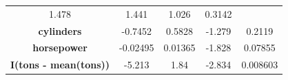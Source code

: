 \documentclass[]{article}
\begin{document}
\begin{longtable}[c]{@{}ccccc@{}}
\begin{minipage}[t]{0.13\columnwidth}
1.478
\strut\end{minipage} &
\begin{minipage}[t]{0.16\columnwidth}\centering\strut
1.441
\strut\end{minipage} &
\begin{minipage}[t]{0.12\columnwidth}\centering\strut
1.026
\strut\end{minipage} &
\begin{minipage}[t]{0.12\columnwidth}\centering\strut
0.3142
\strut\end{minipage}\tabularnewline
\begin{minipage}[t]{0.32\columnwidth}\centering\strut
\textbf{cylinders}
\strut\end{minipage} &
\begin{minipage}[t]{0.13\columnwidth}\centering\strut
-0.7452
\strut\end{minipage} &
\begin{minipage}[t]{0.16\columnwidth}\centering\strut
0.5828
\strut\end{minipage} &
\begin{minipage}[t]{0.12\columnwidth}\centering\strut
-1.279
\strut\end{minipage} &
\begin{minipage}[t]{0.12\columnwidth}\centering\strut
0.2119
\strut\end{minipage}\tabularnewline
\begin{minipage}[t]{0.32\columnwidth}\centering\strut
\textbf{horsepower}
\strut\end{minipage} &
\begin{minipage}[t]{0.13\columnwidth}\centering\strut
-0.02495
\strut\end{minipage} &
\begin{minipage}[t]{0.16\columnwidth}\centering\strut
0.01365
\strut\end{minipage} &
\begin{minipage}[t]{0.12\columnwidth}\centering\strut
-1.828
\strut\end{minipage} &
\begin{minipage}[t]{0.12\columnwidth}\centering\strut
0.07855
\strut\end{minipage}\tabularnewline
\begin{minipage}[t]{0.32\columnwidth}\centering\strut
\textbf{I(tons - mean(tons))}
\strut\end{minipage} &
\begin{minipage}[t]{0.13\columnwidth}\centering\strut
-5.213
\strut\end{minipage} &
\begin{minipage}[t]{0.16\columnwidth}\centering\strut
1.84
\strut\end{minipage} &
\begin{minipage}[t]{0.12\columnwidth}\centering\strut
-2.834
\strut\end{minipage} &
\begin{minipage}[t]{0.12\columnwidth}\centering\strut
0.008603
\strut\end{minipage}\tabularnewline
\bottomrule
\end{longtable}
\end{document}
